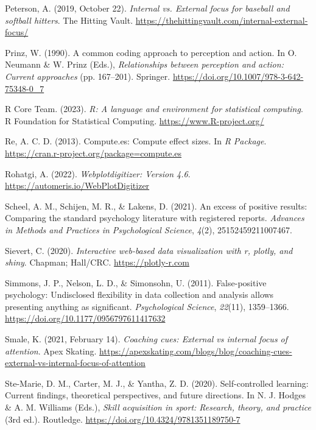 \documentclass[
  11pt,
  doc, donotrepeattitle,floatsintext]{apa7}
\newlength{\cslhangindent}
\newlength{\cslentryspacingunit} %
\newenvironment{CSLReferences}[2] %
 {%
  \setlength{\parindent}{0pt}
  \ifodd #1
  \let\oldpar\par
  \def\par{\hangindent=\cslhangindent\oldpar}
  \fi
  \setlength{\parskip}{#2\cslentryspacingunit}
 }%
 {}
\begin{document}
\begin{CSLReferences}{1}{0}
\leavevmode{}%
Peterson, A. (2019, October 22). \emph{Internal vs. External focus for baseball and softball hitters}. {The Hitting Vault}. \url{https://thehittingvault.com/internal-external-focus/}

\leavevmode{}%
Prinz, W. (1990). A common coding approach to perception and action. In O. Neumann \& W. Prinz (Eds.), \emph{Relationships between perception and action: {Current} approaches} (pp. 167--201). {Springer}. \url{https://doi.org/10.1007/978-3-642-75348-0_7}

\leavevmode{}%
R Core Team. (2023). \emph{R: A language and environment for statistical computing}. R Foundation for Statistical Computing. \url{https://www.R-project.org/}

\leavevmode{}%
Re, A. C. D. (2013). Compute.es: Compute effect sizes. In \emph{R Package}. \url{https://cran.r-project.org/package=compute.es}

\leavevmode{}%
Rohatgi, A. (2022). \emph{Webplotdigitizer: Version 4.6}. \url{https://automeris.io/WebPlotDigitizer}

\leavevmode{}%
Scheel, A. M., Schijen, M. R., \& Lakens, D. (2021). An excess of positive results: Comparing the standard psychology literature with registered reports. \emph{Advances in Methods and Practices in Psychological Science}, \emph{4}(2), 25152459211007467.

\leavevmode{}%
Sievert, C. (2020). \emph{Interactive web-based data visualization with r, plotly, and shiny}. Chapman; Hall/CRC. \url{https://plotly-r.com}

\leavevmode{}%
Simmons, J. P., Nelson, L. D., \& Simonsohn, U. (2011). False-positive psychology: {Undisclosed} flexibility in data collection and analysis allows presenting anything as significant. \emph{Psychological Science}, \emph{22}(11), 1359--1366. \url{https://doi.org/10.1177/0956797611417632}

\leavevmode{}%
Smale, K. (2021, February 14). \emph{Coaching cues: {External} vs internal focus of attention}. {Apex Skating}. \url{https://apexskating.com/blogs/blog/coaching-cues-external-vs-internal-focus-of-attention}

\leavevmode{}%
Ste-Marie, D. M., Carter, M. J., \& Yantha, Z. D. (2020). Self-controlled learning: {Current} findings, theoretical perspectives, and future directions. In N. J. Hodges \& A. M. Williams (Eds.), \emph{Skill acquisition in sport: {Research}, theory, and practice} (3rd ed.). Routledge. \url{https://doi.org/10.4324/9781351189750-7}


\end{CSLReferences}
\end{document}
